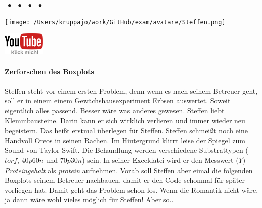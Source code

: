 \documentclass[a4paper, 9pt]{scrartcl}\usepackage[]{graphicx}\usepackage[]{xcolor}
\begin{document}
 
\ifcollection
\begin{flushright}
\tiny\vspace{-3Ex}
\textbf{\examinhaltstart}
\exammodulemathstat $\;\bullet$
\exammodulestat $\;\bullet$
\exammodulestatbbv $\;\bullet$
\exammodulestatversuch $\;\bullet$
\exammodulebiostat
\vspace{-4Ex}
\end{flushright}
\begin{minipage}[t]{0.5\textwidth}
\texttt{[image: /Users/kruppajo/work/GitHub/exam/avatare/Steffen.png]}
\end{minipage}
\begin{minipage}[t]{0.5\textwidth}
\hfill
\href{https://youtu.be/Xf0yE-o7bEU}{\includegraphics[width = 2cm]{img/youtube}}
\end{minipage}
\vspace{-3ex}
\fi



\ifcollection
\paragraph{Zerforschen des Boxplots}
\fi

Steffen steht vor einem ersten Problem, denn wenn es nach seinem Betreuer geht, soll er in einem einem Gewächshausexperiment Erbsen auswertet. Soweit eigentlich alles passend. Besser wäre was anderes gewesen. Steffen liebt Klemmbausteine. Darin kann er sich wirklich verlieren und immer wieder neu begeistern. Das heißt erstmal überlegen für Steffen. Steffen schmeißt noch eine Handvoll Oreos in seinen Rachen. Im Hintergrund klirrt leise der Spiegel zum Sound von Taylor Swift. Die Behandlung werden verschiedene Substrattypen ($torf$, $40p60n$ und $70p30n$) sein. In seiner Exceldatei wird er den Messwert ($Y$) \textit{Proteingehalt} als \textit{protein} aufnehmen. Vorab soll Steffen aber eimal die folgenden Boxplots seinem Betreuer nachbauen, damit er den \Rlogo Code schonmal für später vorliegen hat. Damit geht das Problem schon los. Wenn die Romantik nicht wäre, ja dann wäre wohl vieles möglich für Steffen! Aber so..
\end{document}
